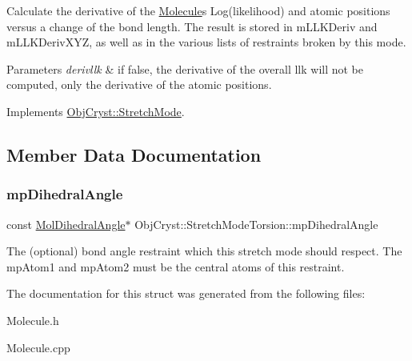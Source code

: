 Calculate the derivative of the \mbox{\hyperlink{class_obj_cryst_1_1_molecule}{Molecule}}\textquotesingle{}s Log(likelihood) and atomic positions versus a change of the bond length. The result is stored in m\+L\+L\+K\+Deriv and m\+L\+L\+K\+Deriv\+X\+YZ, as well as in the various lists of restraints broken by this mode.


\begin{DoxyParams}{Parameters}
{\em derivllk} & if false, the derivative of the overall llk will not be computed, only the derivative of the atomic positions. \\
\hline
\end{DoxyParams}


Implements \mbox{\hyperlink{struct_obj_cryst_1_1_stretch_mode_a5b5ab5f9819c047a49719a330722d419}{Obj\+Cryst\+::\+Stretch\+Mode}}.



\subsection{Member Data Documentation}
\mbox{\label{struct_obj_cryst_1_1_stretch_mode_torsion_a93128fa32715a53d1ecc6758283f8641}} 
\subsubsection{\texorpdfstring{mpDihedralAngle}{mpDihedralAngle}}
{\footnotesize\ttfamily const \mbox{\hyperlink{class_obj_cryst_1_1_mol_dihedral_angle}{Mol\+Dihedral\+Angle}}$\ast$ Obj\+Cryst\+::\+Stretch\+Mode\+Torsion\+::mp\+Dihedral\+Angle}

The (optional) bond angle restraint which this stretch mode should respect. The mp\+Atom1 and mp\+Atom2 must be the central atoms of this restraint. 

The documentation for this struct was generated from the following files\+:\begin{DoxyCompactItemize}
\item 
Molecule.\+h\item 
Molecule.\+cpp\end{DoxyCompactItemize}
